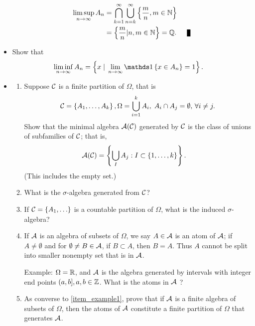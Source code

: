 \documentclass[11pt]{article}
\begin{document}
\begin{itemize}
\begin{solution}
\begin{align*}
\limsup\limits_{n\rightarrow \infty}A_{n} &= \bigcap_{k=1}^{\infty}\bigcup_{n= k}^{\infty}\set{\frac{m}{n}, m\in \bN}\\
&= \set{\frac{m}{n}| n,m\in \bN}= \bQ.  \qed
\end{align*} 
\end{solution}


\item \begin{example} \citep{resnick2013probability}
Show that 
\begin{align*}
\liminf\limits_{n\rightarrow \infty}A_{n} &= \set{x\;| \;  \lim\limits_{n\rightarrow \infty}\ind{x\in A_{n}} = 1  }.
\end{align*}
\end{example}


\item \begin{example} \citep{resnick2013probability}
\begin{enumerate}
\item\label{item_example1} Suppose ${\mathcal C}$ is a finite partition of $\Omega$, that is 
\begin{align*}
{\mathcal C} = \left\{A_{1}, \ldots, A_{k}\right\}, \Omega = \bigcup_{i=1}^{k}A_{i}, \; A_{i}\cap A_{j} = \emptyset,\, \forall i\neq j. 
\end{align*}
Show that the minimal algebra ${\mathcal A}({\mathcal C})$ generated by ${\mathcal C}$ is the class of unions of subfamilies of ${\mathcal C}$; that is, 
\begin{align*}
{\mathcal A}({\mathcal C}) &= \left\{ \bigcup_{I}A_{j}: I \subset \left\{1,\ldots, k\right\} \right\}.
\end{align*} (This includes the empty set.)

\item What is the $\sigma$-algebra generated from ${\mathcal C}$?

\item If ${\mathcal C} = \left\{A_{1}, \ldots \right\}$ is a countable partition of $\Omega$, what is the induced $\sigma$-algebra? 

\item If ${\mathcal A}$ is an algebra of subsets of $\Omega$, we say $A\in {\mathcal A}$ is an atom of ${\mathcal A}$; if $A\neq \emptyset$ and for $\emptyset \neq B\in {\mathcal A}$, if $B \subset A$, then $B=A$. Thus $A$ cannot be split into smaller nonempty set that is in ${\mathcal A}$. 

Example: $\Omega = {\mathbb R}$, and ${\mathcal A}$ is the algebra generated by intervals with integer end points $(a,b], a,b\in {\mathbb Z}$. What is the atoms in ${\mathcal A}$ ?

\item As converse to \eqref{item_example1}, prove that if ${\mathcal A}$ is a finite algebra of subsets of $\Omega$, then the atoms of ${\mathcal A}$ constitute a finite partition of $\Omega$  that generates ${\mathcal A}$.
\end{enumerate}
\end{example}
\end{itemize}
\newpage


\end{document}
